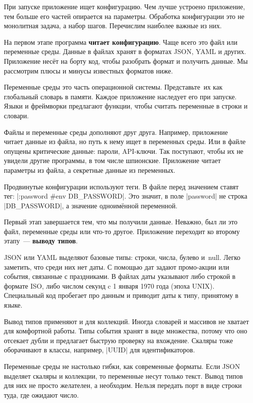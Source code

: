 При запуске приложение ищет конфигурацию. Чем лучше устроено приложение, тем
больше его частей опирается на параметры. Обработка конфигурации это не
монолитная задача, а набор шагов. Перечислим наиболее важные из них.

На первом этапе программа \textbf{читает конфигурацию}. Чаще всего это файл или
переменные среды. Данные в файлах хранят в форматах JSON, YAML и
других. Приложение нес\"{е}т на борту код, чтобы разобрать формат и получить
данные. Мы рассмотрим плюсы и минусы известных форматов ниже.

Переменные среды это часть операционной системы. Представьте~их как глобальный
словарь в памяти. Каждое приложение наследует его при запуске. Языки и
фреймворки предлагают функции, чтобы считать переменные в строки и словари.

Файлы и переменные среды дополняют друг друга. Например, приложение читает
данные из файла, но путь к нему ищет в переменных среды. Или в файле опущены
критические данные: пароли, API-ключи. Так поступают, чтобы их не увидели другие
программы, в том числе шпионские. Приложение читает параметры из файла, а
секретные данные из переменных.


Продвинутые конфигурации используют теги. В файле перед значением
ставят тег: \spverb|:password #env DB_PASSWORD|. Это значит, в поле
\spverb|password| не строка \spverb|DB_PASSWORD|, а значение одноим\"{е}нной
переменной.

Первый этап завершается тем, что мы получили данные. Неважно, был ли это файл,
переменные среды или что-то другое. Приложение переходит ко второму этапу~---
\textbf{выводу типов}.


JSON или YAML выделяют базовые типы: строки, числа, булево и~null. Легко
заметить, что среди них нет даты. С помощью дат задают промо-акции или события,
связанные с праздниками. В файлах даты указывают либо строкой в формате ISO,
либо числом секунд c 1 января 1970 года (эпоха UNIX). Специальный код пробегает
про данным и приводит даты к типу, принятому в языке.

Вывод типов применяют и для коллекций. Иногда словарей и массивов не хватает для
комфортной работы. Типы события хранят в виде множества, потому что оно отсекает
дубли и предлагает быструю проверку на вхождение. Скаляры тоже оборачивают в
классы, например, \spverb|UUID| для идентификаторов.

Переменные среды не настолько гибки, как современные форматы. Если JSON выделяет
скаляры и коллекции, то переменные несут только текст. Вывод типов для них не
просто желателен, а необходим. Нельзя передать порт в виде строки туда, где
ожидают число.

